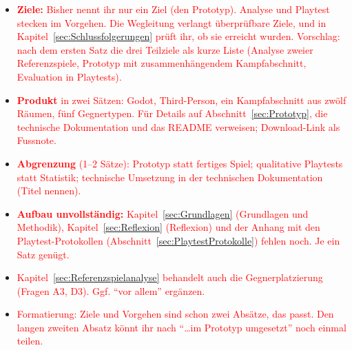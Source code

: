 \documentclass[../Main.tex]{subfiles}
\begin{document}
\begin{itemize}[leftmargin=1.5cm]
    \item \textcolor{red}{\textbf{Ziele:} Bisher nennt ihr nur ein Ziel (den Prototyp). Analyse und Playtest stecken im Vorgehen. Die Wegleitung verlangt überprüfbare Ziele, und in Kapitel~\ref{sec:Schlussfolgerungen} prüft ihr, ob sie erreicht wurden. Vorschlag: nach dem ersten Satz die drei Teilziele als kurze Liste (Analyse zweier Referenzspiele, Prototyp mit zusammenhängendem Kampfabschnitt, Evaluation in Playtests).}
    \item \textcolor{red}{\textbf{Produkt} in zwei Sätzen: Godot, Third-Person, ein Kampfabschnitt aus zwölf Räumen, fünf Gegnertypen. Für Details auf Abschnitt~\ref{sec:Prototyp}, die technische Dokumentation und das README verweisen; Download-Link als Fussnote.}
    \item \textcolor{red}{\textbf{Abgrenzung} (1--2 Sätze): Prototyp statt fertiges Spiel; qualitative Playtests statt Statistik; technische Umsetzung in der technischen Dokumentation (Titel nennen).}
    \item \textcolor{red}{\textbf{Aufbau unvollständig:} Kapitel~\ref{sec:Grundlagen} (Grundlagen und Methodik), Kapitel~\ref{sec:Reflexion} (Reflexion) und der Anhang mit den Playtest-Protokollen (Abschnitt~\ref{sec:PlaytestProtokolle}) fehlen noch. Je ein Satz genügt.}
    \item \textcolor{red}{Kapitel~\ref{sec:Referenzspielanalyse} behandelt auch die Gegnerplatzierung (Fragen A3, D3). Ggf. \enquote{vor allem} ergänzen.}
    \item \textcolor{red}{Formatierung: Ziele und Vorgehen sind schon zwei Absätze, das passt. Den langen zweiten Absatz könnt ihr nach \enquote{\ldots im Prototyp umgesetzt} noch einmal teilen.}
\end{itemize}

\newpage
\end{document}
